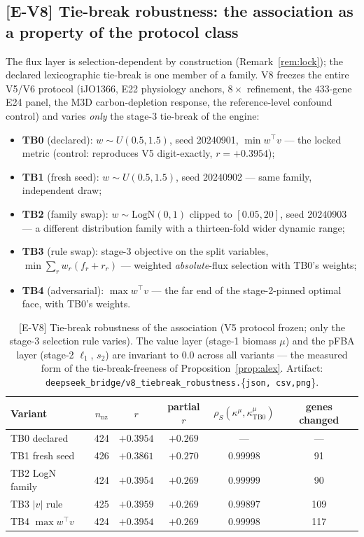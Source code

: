 \documentclass[11pt,a4paper]{article}
\theoremstyle{plain}
\theoremstyle{definition}
\theoremstyle{remark}
\newcommand{\kmu}{\kappa^{\mu}}
\begin{document}
\subsection{[E-V8] Tie-break robustness: the association as a property
of the protocol class}\label{sec:v8}

The flux layer is selection-dependent by construction
(Remark~\ref{rem:lock}); the declared lexicographic tie-break is one
member of a family. V8 freezes the entire V5/V6 protocol (iJO1366,
E22 physiology anchors, $8\times$ refinement, the $433$-gene E24
panel, the M3D carbon-depletion response, the reference-level
confound control) and varies \emph{only} the stage-3 tie-break of the
engine:
\begin{itemize}
\item \textbf{TB0} (declared): $w \sim U(0.5, 1.5)$, seed 20240901,
      $\min w^\top v$ --- the locked metric (control: reproduces V5
      digit-exactly, $r = +0.3954$);
\item \textbf{TB1} (fresh seed): $w \sim U(0.5, 1.5)$, seed 20240902
      --- same family, independent draw;
\item \textbf{TB2} (family swap): $w \sim \mathrm{LogN}(0, 1)$ clipped
      to $[0.05, 20]$, seed 20240903 --- a different distribution
      family with a thirteen-fold wider dynamic range;
\item \textbf{TB3} (rule swap): stage-3 objective on the split
      variables, $\min \sum_r w_r (f_r + r_r)$ --- weighted
      \emph{absolute}-flux selection with TB0's weights;
\item \textbf{TB4} (adversarial): $\max w^\top v$ --- the far end of
      the stage-2-pinned optimal face, with TB0's weights.
\end{itemize}

\begin{table}[t]
\centering
\caption{[E-V8] Tie-break robustness of the association (V5 protocol
frozen; only the stage-3 selection rule varies). The value layer
(stage-1 biomass $\mu$) and the pFBA layer (stage-2 $\ell_1$, $s_2$)
are invariant to $0.0$ across all variants --- the measured form of
the tie-break-freeness of Proposition~\ref{prop:alex}. Artifact:
\texttt{deepseek\_bridge/v8\_tiebreak\_robustness.}\{\texttt{json,
csv,png}\}.}
\label{tab:v8}
\begin{tabular}{lccccc}
\toprule
Variant & $n_{\mathrm{nz}}$ & $r$ & partial $r$ &
$\rho_S(\kmu, \kmu_{\mathrm{TB0}})$ & genes changed \\
\midrule
TB0 declared       & 424 & $+0.3954$ & $+0.269$ & --- & --- \\
TB1 fresh seed     & 426 & $+0.3861$ & $+0.270$ & $0.99998$ & 91 \\
TB2 LogN family    & 424 & $+0.3954$ & $+0.269$ & $0.99999$ & 90 \\
TB3 $|v|$ rule     & 425 & $+0.3959$ & $+0.269$ & $0.99897$ & 109 \\
TB4 $\max w^\top v$& 424 & $+0.3954$ & $+0.269$ & $0.99998$ & 117 \\
\bottomrule
\end{tabular}
\end{table}
\end{document}
